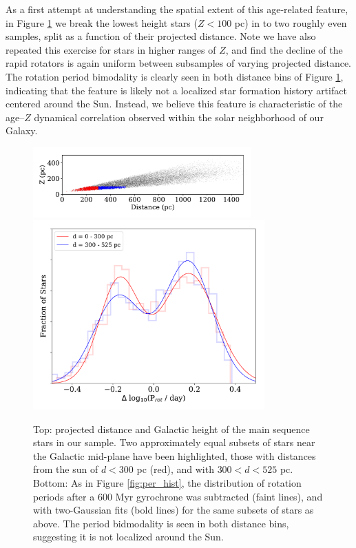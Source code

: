 \documentclass[preprint2]{aastex62}
\begin{document}
As a first attempt at understanding the spatial extent of this age-related feature, in Figure \ref{fig:dZ} we break the lowest height stars ($Z < 100$ pc) in to two roughly even samples, split as a function of their projected distance. Note we have also repeated this exercise for stars in higher ranges of $Z$, and find the decline of the rapid rotators is again uniform between subsamples of varying projected distance. The rotation period bimodality is clearly seen in both distance bins of Figure \ref{fig:dZ}, indicating that the feature is likely not a localized star formation history artifact centered around the Sun. Instead, we believe this feature is characteristic of the age--$Z$ dynamical correlation observed within the solar neighborhood of our Galaxy. 


\begin{figure}[!ht]
\centering
\includegraphics[width=3.3in]{../figures/dist_Z}
\includegraphics[width=3.5in]{../figures/delta_per_subZ}
\caption{
Top: projected distance and Galactic height of the main sequence stars in our sample. Two approximately equal subsets of stars near the Galactic mid-plane have been highlighted, those with distances from the sun of $d<300$ pc (red), and with $300<d<525$ pc.
Bottom: As in Figure \ref{fig:per_hist}, the distribution of rotation periods after a 600 Myr gyrochrone was subtracted (faint lines), and with two-Gaussian fits (bold lines) for the same subsets of stars as above. The period bidmodality is seen in both distance bins, suggesting it is not localized around the Sun.
}
\label{fig:dZ}
\end{figure}
\end{document}
